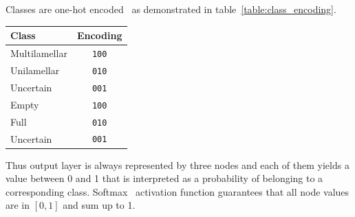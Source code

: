 \documentclass[a4paper, 11pt, table]{article}
\begin{document}
Classes are one-hot encoded~\cite{harris2013digital} as demonstrated in table~\ref{table:class_encoding}.

\begin{center}
\label{table:class_encoding}
\begin{tabular}{|lc|}
\toprule 
Class & Encoding \\ 
\midrule 
Multilamellar & \texttt{100} \\ 
Unilamellar & \texttt{010} \\ 
Uncertain & \texttt{001} \\ 
\midrule 
Empty & \texttt{100} \\ 
Full & \texttt{010} \\ 
Uncertain & \texttt{001} \\ 
\bottomrule 
\end{tabular} 
\end{center}

Thus output layer is always represented by three nodes and each of them yields a value between 0 and 1 that is interpreted as a probability of belonging to a corresponding class. Softmax~\cite{Bishop:2006:PRM:1162264} activation function guarantees that all node values are in $[0, 1]$ and sum up to 1. 
\end{document}
